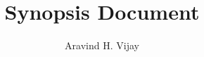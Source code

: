 
\title{Synopsis Document}
\author{Aravind H. Vijay}


    \maketitle
    \tableofcontents
    \thispagestyle{empty}
	

